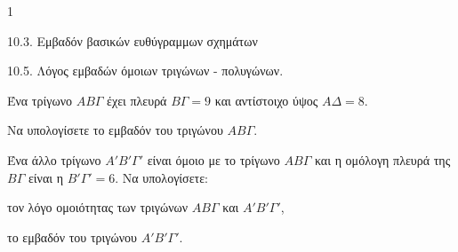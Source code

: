 \begin{ylh}{1}
    \item 10.3. Εμβαδόν βασικών ευθύγραμμων σχημάτων
    \item 10.5. Λόγος εμβαδών όμοιων τριγώνων - πολυγώνων.
\end{ylh}
Ένα τρίγωνο $AB\Gamma$ έχει πλευρά $B\Gamma = 9$ και αντίστοιχο ύψος $A\Delta = 8$.
\begin{alist}
\item Να υπολογίσετε το εμβαδόν του τριγώνου $AB\Gamma$. 
\item Ένα άλλο τρίγωνο $A'B'\Gamma'$ είναι όμοιο με το τρίγωνο $AB\Gamma$ και η ομόλογη πλευρά της $B\Gamma$ είναι η $B'\Gamma' = 6$. Να υπολογίσετε:
    \begin{rlist}
    \item τον λόγο ομοιότητας των τριγώνων $AB\Gamma$ και $A'B'\Gamma'$, 
    \item το εμβαδόν του τριγώνου $A'B'\Gamma'$. 
    \end{rlist}
\end{alist}